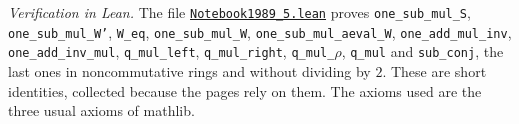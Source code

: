 \emph{Verification in Lean.} The file \href{\leanblobmain/Notebook1989_5.lean}{\texttt{Notebook1989\_5.\allowbreak{}lean}} proves \texttt{one\_sub\_mul\_S}, \texttt{one\_sub\_mul\_W'}, \texttt{W\_eq}, \texttt{one\_sub\_mul\_W}, \texttt{one\_sub\_mul\_aeval\_W}, \texttt{one\_add\_mul\_inv}, \texttt{one\_add\_inv\_mul}, \texttt{q\_mul\_left}, \texttt{q\_mul\_right}, \texttt{q\_mul\_}$\rho$, \texttt{q\_mul} and \texttt{sub\_conj}, the last ones in noncommutative rings and without dividing by $2$. These are short identities, collected because the pages rely on them. The axioms used are the three usual axioms of mathlib.

